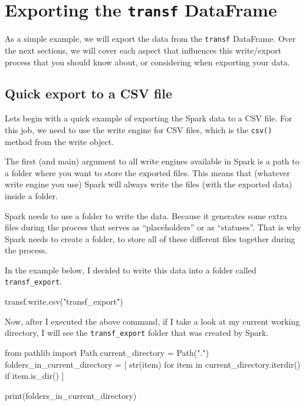 \documentclass[
  11pt,
  letterpaper,
  DIV=11,
  numbers=noendperiod]{scrreprt}
\newenvironment{Shaded}{\begin{snugshade}}{\end{snugshade}}
\newcommand{\BuiltInTok}[1]{\textcolor[rgb]{0.00,0.23,0.31}{#1}}
\newcommand{\ControlFlowTok}[1]{\textcolor[rgb]{0.00,0.23,0.31}{#1}}
\newcommand{\ImportTok}[1]{\textcolor[rgb]{0.00,0.46,0.62}{#1}}
\newcommand{\KeywordTok}[1]{\textcolor[rgb]{0.00,0.23,0.31}{#1}}
\newcommand{\NormalTok}[1]{\textcolor[rgb]{0.00,0.23,0.31}{#1}}
\newcommand{\OperatorTok}[1]{\textcolor[rgb]{0.37,0.37,0.37}{#1}}
\newcommand{\StringTok}[1]{\textcolor[rgb]{0.13,0.47,0.30}{#1}}
\begin{document}
\hypertarget{sec-write-example}{%
\section{\texorpdfstring{Exporting the \texttt{transf}
DataFrame}{Exporting the transf DataFrame}}\label{sec-write-example}}

As a simple example, we will export the data from the \texttt{transf}
DataFrame. Over the next sections, we will cover each aspect that
influences this write/export process that you should know about, or
considering when exporting your data.

\hypertarget{quick-export-to-a-csv-file}{%
\subsection{Quick export to a CSV
file}\label{quick-export-to-a-csv-file}}

Lets begin with a quick example of exporting the Spark data to a CSV
file. For this job, we need to use the write engine for CSV files, which
is the \texttt{csv()} method from the write object.

The first (and main) argument to all write engines available in Spark is
a path to a folder where you want to store the exported files. This
means that (whatever write engine you use) Spark will always write the
files (with the exported data) inside a folder.

Spark needs to use a folder to write the data. Because it generates some
extra files during the process that serves as ``placeholders'' or as
``statuses''. That is why Spark needs to create a folder, to store all
of these different files together during the process.

In the example below, I decided to write this data into a folder called
\texttt{transf\_export}.

\begin{Shaded}
\begin{Highlighting}[]
\NormalTok{transf.write.csv(}\StringTok{"transf\_export"}\NormalTok{)}
\end{Highlighting}
\end{Shaded}

Now, after I executed the above command, if I take a look at my current
working directory, I will see the \texttt{transf\_export} folder that
was created by Spark.

\begin{Shaded}
\begin{Highlighting}[]
\ImportTok{from}\NormalTok{ pathlib }\ImportTok{import}\NormalTok{ Path}
\NormalTok{current\_directory }\OperatorTok{=}\NormalTok{ Path(}\StringTok{"."}\NormalTok{)}
\NormalTok{folders\_in\_current\_directory }\OperatorTok{=}\NormalTok{ [}
    \BuiltInTok{str}\NormalTok{(item)}
    \ControlFlowTok{for}\NormalTok{ item }\KeywordTok{in}\NormalTok{ current\_directory.iterdir()}
    \ControlFlowTok{if}\NormalTok{ item.is\_dir()}
\NormalTok{]}

\BuiltInTok{print}\NormalTok{(folders\_in\_current\_directory)}
\end{Highlighting}
\end{Shaded}
\end{document}
